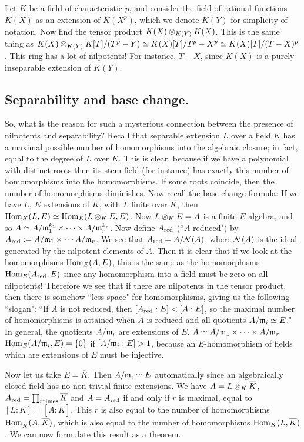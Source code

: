 Let $K$ be a field of characteristic $p$, and consider the field of rational functions $K(X)$ as an extension of $K(X^p)$, which we denote $K(Y)$ for simplicity of notation.
Now find the tensor product $K(X) \otimes_{K(Y)} K(X)$.
This is the same thing as $K(X) \otimes_{K(Y)} K[T] / (T^p - Y) \simeq K(X)[T] / T^p - X^p \simeq K(X)[T] / (T - X)^p$.
This ring has a lot of nilpotents!
For instance, $T - X$, since $K(X)$ is a purely inseparable extension of $K(Y)$.

\subsection{Separability and base change.}
So, what is the reason for such a mysterious connection between the presence of nilpotents and separability?
Recall that separable extension $L$ over a field $K$ has a maximal possible number of homomorphisms into the algebraic closure; in fact, equal to the degree of $L$ over $K$.
This is clear, because if we have a polynomial with distinct roots then its stem field (for instance) has exactly this number of homomorphisms into the homomorphisms.
If some roots coincide, then the number of homomorphisms diminishes.
Now recall the base-change formula:
If we have $L$, $E$ extensions of $K$, with $L$ finite over $K$, then $\mathrm{Hom}_{K}({L, E}) \simeq \mathrm{Hom}_{E}({L \otimes_{K} E, E})$.
Now $L \otimes_{K} E = A$ is a finite $E$-algebra, and so $A \simeq A / \mathfrak{m}_1^{k_1} \times \dotsb \times A/\mathfrak{m}_r^{k_r}$.
Now define $A_{\mathrm{red}}$ (``$A$-reduced") by $A_{\mathrm{red}} := A / \mathfrak{m}_1 \times \dotsb A / \mathfrak{m}_r$.
We see that $A_{\mathrm{red}} = A / \mathcal{N}(A)$, where $\mathcal{N}(A)$ is the ideal generated by the nilpotent elements of $A$.
Then it is clear that if we look at the homomorphisms $\mathrm{Hom}_{E}({A, E})$, this is the same as the homomorphisms $\mathrm{Hom}_{E}({A_{\mathrm{red}}, E})$ since any homomorphism into a field must be zero on all nilpotents!
Therefore we see that if there are nilpotents in the tensor product, then there is somehow ``less space" for homomorphisms, giving us the following ``slogan":
``If $A$ is not reduced, then $[A_{\mathrm{red}} : E] < [A : E]$, so the maximal number of homomorphisms is attained when $A$ is reduced and all quotients $A / \mathfrak{m}_i \simeq E$."
In general, the quotients $A / \mathfrak{m}_i$ are extensions of $E$.
$A \simeq A / \mathfrak{m}_1 \times \dotsb \times A / \mathfrak{m}_r$
$\mathrm{Hom}_{E}({A / \mathfrak{m}_i, E}) = \{ 0 \}$ if $[A / \mathfrak{m}_i : E] > 1$, because an $E$-homomorphism of fields which are extensions of $E$ must be injective.

Now let us take $E = \overline{K}$. 
Then $A / \mathfrak{m}_i \simeq E$ automatically since an algebraically closed field has no non-trivial finite extensions.
We have $A = L \otimes_{K} \overline{K}$, $A_{\mathrm{red}} = \prod_{r \text{times}} \overline{K}$ and $A = A_{\mathrm{red}}$ if and only if $r$ is maximal, equal to $[L : K] = [A : \overline{K}]$. 
This $r$ is also equal to the number of homomorphisms $\mathrm{Hom}_{\overline{K}}({A, \overline{K}})$, which is also equal to the number of homomorphisms $\mathrm{Hom}_{K}({L, \overline{K}})$.
We can now formulate this result as a theorem.

